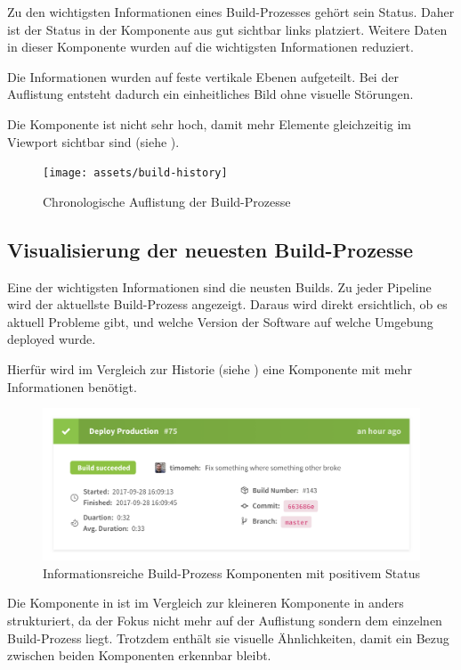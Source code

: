 Zu den wichtigsten Informationen eines Build-Prozesses gehört sein Status. Daher ist der Status in der Komponente aus  gut sichtbar links platziert. Weitere Daten in dieser Komponente wurden auf die wichtigsten Informationen reduziert.

Die Informationen wurden auf feste vertikale Ebenen aufgeteilt. Bei der Auflistung entsteht dadurch ein einheitliches Bild ohne visuelle Störungen.

Die Komponente ist nicht sehr hoch, damit mehr Elemente gleichzeitig im Viewport sichtbar sind (siehe ).

\begin{figure}[H]
  \caption{Chronologische Auflistung der Build-Prozesse}
  \label{fig:build-history}
  \centering
    \texttt{[image: assets/build-history]}
\end{figure}

\subsection{Visualisierung der neuesten Build-Prozesse}

Eine der wichtigsten Informationen sind die neusten Builds. Zu jeder Pipeline wird der aktuellste Build-Prozess angezeigt. Daraus wird direkt ersichtlich, ob es aktuell Probleme gibt, und welche Version der Software auf welche Umgebung deployed wurde.

Hierfür wird im Vergleich zur Historie (siehe ) eine Komponente mit mehr Informationen benötigt.

\begin{figure}[h]
  \caption{Informationsreiche Build-Prozess Komponenten mit positivem Status}
  \label{fig:build-process-detail}
  \centering
    \includegraphics[width=\textwidth]{assets/build-detail-finished}
\end{figure}

Die Komponente in  ist im Vergleich zur kleineren Komponente in  anders strukturiert, da der Fokus nicht mehr auf der Auflistung sondern dem einzelnen Build-Prozess liegt. Trotzdem enthält sie visuelle Ähnlichkeiten, damit ein Bezug zwischen beiden Komponenten erkennbar bleibt.

